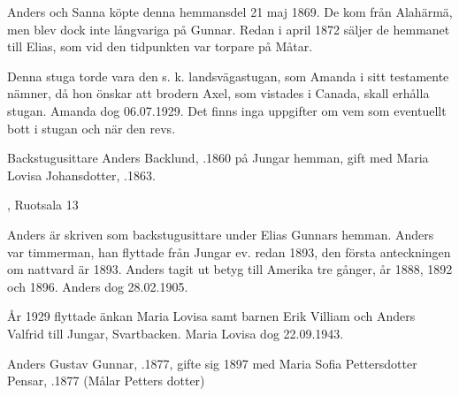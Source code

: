 Anders och Sanna köpte denna hemmansdel 21 maj 1869. De kom från Alahärmä, men blev dock inte långvariga på Gunnar. Redan i april 1872 säljer de hemmanet till Elias, som vid den tidpunkten var torpare på Måtar.





Denna stuga torde vara den s. k. landsvägastugan, som Amanda i sitt testamente nämner, då hon önskar att brodern Axel, som vistades i Canada, skall erhålla stugan. Amanda dog 06.07.1929. Det finns inga uppgifter om vem som eventuellt bott i stugan och när den revs.


Backstugusittare Anders Backlund, .1860 på Jungar hemman, gift med Maria Lovisa Johansdotter, .1863.
\begin{jhchildren}
  \item {}
  \item {}
  \item {}, Ruotsala 13
  \item {}
  \item {}
\end{jhchildren}

Anders är skriven som backstugusittare under Elias Gunnars hemman. Anders var timmerman, han flyttade från Jungar ev. redan 1893, den första anteckningen om nattvard är 1893. Anders tagit ut betyg till Amerika tre gånger, år 1888, 1892 och 1896. Anders dog 28.02.1905.

År 1929 flyttade änkan Maria Lovisa samt barnen Erik Villiam och Anders Valfrid till Jungar, Svartbacken. Maria Lovisa dog 22.09.1943.


Anders Gustav Gunnar, .1877, gifte sig 1897 med Maria Sofia Pettersdotter Pensar, .1877 (Målar Petters dotter)
\begin{jhchildren}
  \item {}
  \item {}
  \item {}
\end{jhchildren}

